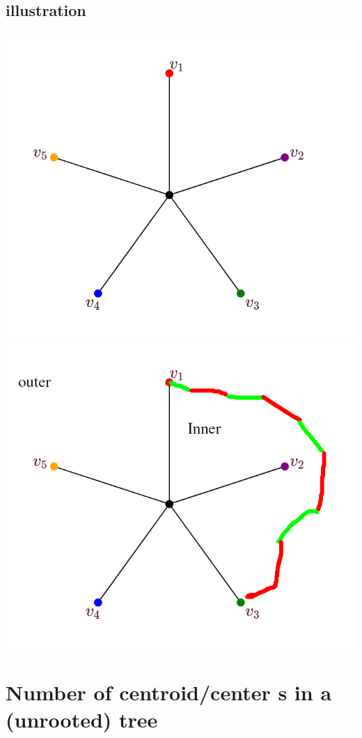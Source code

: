 \documentclass{article}
\begin{document}
\newpage
\subsection*{illustration}
\includegraphics{images/ch5-five-coloring-p1.png}
\includegraphics{images/ch5-five-coloring-p2.png}

\newpage
\section{Number of centroid/center s in a (unrooted) tree}
\end{document}
